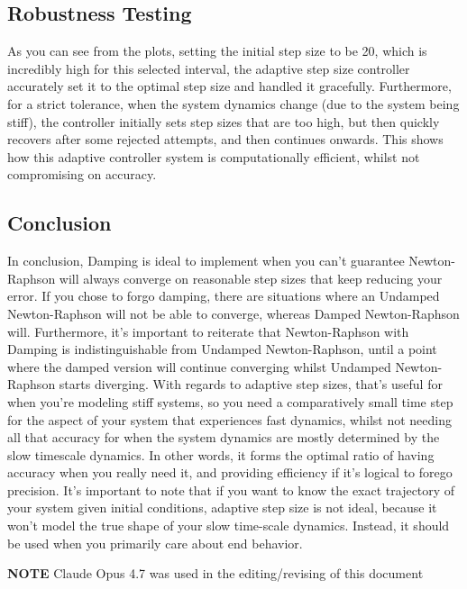\documentclass[11pt]{article}
\begin{document}
\subsection{Robustness Testing}\label{robustness-testing}

As you can see from the plots, setting the initial step size to be 20,
which is incredibly high for this selected interval, the adaptive step
size controller accurately set it to the optimal step size and handled
it gracefully. Furthermore, for a strict tolerance, when the system
dynamics change (due to the system being stiff), the controller
initially sets step sizes that are too high, but then quickly recovers
after some rejected attempts, and then continues onwards. This shows how
this adaptive controller system is computationally efficient, whilst not
compromising on accuracy.

\subsection{Conclusion}\label{conclusion}

In conclusion, Damping is ideal to implement when you can't guarantee
Newton-Raphson will always converge on reasonable step sizes that keep
reducing your error. If you chose to forgo damping, there are situations
where an Undamped Newton-Raphson will not be able to converge, whereas
Damped Newton-Raphson will. Furthermore, it's important to reiterate
that Newton-Raphson with Damping is indistinguishable from Undamped
Newton-Raphson, until a point where the damped version will continue
converging whilst Undamped Newton-Raphson starts diverging. With regards
to adaptive step sizes, that's useful for when you're modeling stiff
systems, so you need a comparatively small time step for the aspect of
your system that experiences fast dynamics, whilst not needing all that
accuracy for when the system dynamics are mostly determined by the slow
timescale dynamics. In other words, it forms the optimal ratio of having
accuracy when you really need it, and providing efficiency if it's
logical to forego precision. It's important to note that if you want to
know the exact trajectory of your system given initial conditions,
adaptive step size is not ideal, because it won't model the true shape
of your slow time-scale dynamics. Instead, it should be used when you
primarily care about end behavior.

\textbf{NOTE} Claude Opus 4.7 was used in the editing/revising of this
document

    


    
    
    
\end{document}
